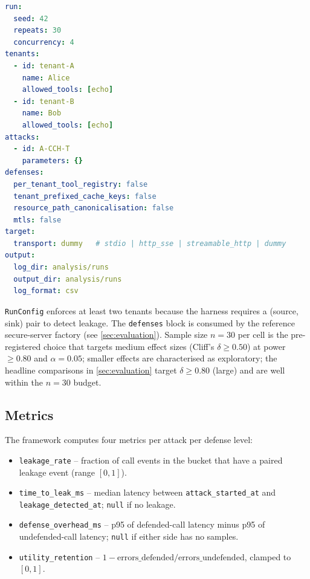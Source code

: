 \documentclass[sigconf, anonymous, natbib=false]{acmart}
\begin{document}
\begin{lstlisting}[language=yaml,
  caption={RunConfig schema (excerpt).},label=lst:runconfig]
run:
  seed: 42
  repeats: 30
  concurrency: 4
tenants:
  - id: tenant-A
    name: Alice
    allowed_tools: [echo]
  - id: tenant-B
    name: Bob
    allowed_tools: [echo]
attacks:
  - id: A-CCH-T
    parameters: {}
defenses:
  per_tenant_tool_registry: false
  tenant_prefixed_cache_keys: false
  resource_path_canonicalisation: false
  mtls: false
target:
  transport: dummy   # stdio | http_sse | streamable_http | dummy
output:
  log_dir: analysis/runs
  output_dir: analysis/runs
  log_format: csv
\end{lstlisting}

\texttt{RunConfig} enforces at least two tenants because
the harness requires a (source, sink) pair to detect
leakage. The \texttt{defenses} block is consumed by the
reference secure-server factory (see
\cref{sec:evaluation}). Sample size $n = 30$ per cell is
the pre-registered choice that targets medium effect
sizes (Cliff's $\delta \geq 0.50$) at power $\geq 0.80$
and $\alpha = 0.05$; smaller effects are characterised as
exploratory; the headline comparisons in
\cref{sec:evaluation} target $\delta \geq 0.80$ (large)
and are well within the $n = 30$ budget.

\subsection{Metrics}

The framework computes four metrics per attack per defense
level:

\begin{itemize}
  \item \texttt{leakage\_rate} -- fraction of call events
        in the bucket that have a paired leakage event
        (range $[0, 1]$).
  \item \texttt{time\_to\_leak\_ms} -- median latency
        between \texttt{attack\_started\_at} and
        \texttt{leakage\_detected\_at}; \texttt{null} if no
        leakage.
  \item \texttt{defense\_overhead\_ms} -- p95 of
        defended-call latency minus p95 of
        undefended-call latency; \texttt{null} if either
        side has no samples.
  \item \texttt{utility\_retention} -- $1 -
        \mathrm{errors\_defended}/\mathrm{errors\_undefended}$,
        clamped to $[0, 1]$.
\end{itemize}
\end{document}
